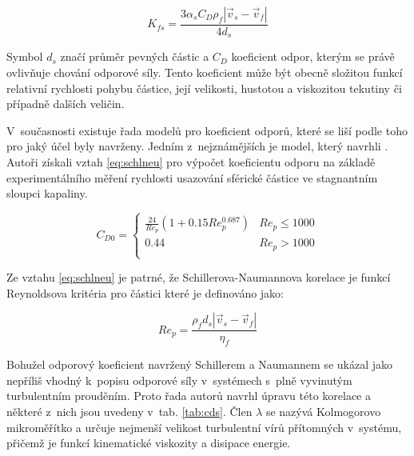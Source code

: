 \begin{equation}
	K_{fs}= \frac{3\alpha_{s}C_{D}\rho_{f}|\vec{v}_{s} - \vec{v}_{f}|}{4d_{s}}
	\label{eq:kfs}
\end{equation}
  
\noindent Symbol $d_{s}$ značí průměr pevných částic a $C_{D}$ koeficient odpor, kterým se právě ovlivňuje chování odporové síly. Tento koeficient může být obecně složitou funkcí relativní rychlosti pohybu částice, její velikosti, hustotou a viskozitou tekutiny či případně dalších veličin.   

V~současnosti existuje řada modelů pro koeficient odporů, které se liší podle toho pro jaký účel byly navrženy. Jedním z~nejznámějších je model, který navrhli \citet{schi32}. Autoři získali vztah \ref{eq:schlneu} pro výpočet koeficientu odporu na základě experimentálního měření rychlosti usazování sférické částice ve stagnantním sloupci kapaliny.    
 
	\hypertarget{hyp:schlneu}{} 
\begin{equation}
	\label{eq:schlneu}
  C_{D0} = \left\{ \begin{array}{ll}
  \frac{24}{Re_{p}}  \left( 1 + \num{0.15}Re_{p}^{\num{0.687}} \right) & Re_{p} \le 1000\\
  \num{0.44} & Re_{p} > 1000\\
  \end{array} \right.
\end{equation}

\noindent Ze vztahu \ref{eq:schlneu} je patrné, že Schillerova-Naumannova korelace je funkcí Reynoldsova kritéria pro částici které je definováno jako:

\begin{equation}
	Re_{p}= \frac{\rho_{f}d_{s}|\vec{v}_{s} - \vec{v}_{f}|}{\eta_{f}}
	\label{eq:reyp}
\end{equation}

Bohužel odporový koeficient navržený Schillerem a Naumannem se ukázal jako nepříliš vhodný k~popisu odporové síly v~systémech s~plně vyvinutým turbulentním prouděním. Proto řada autorů navrhl úpravu této korelace a některé z~nich jsou uvedeny v~tab. \ref{tab:cds}. Člen $\lambda$ se nazývá Kolmogorovo mikroměřítko a určuje nejmenší velikost turbulentní vírů přítomných v~systému, přičemž je funkcí kinematické viskozity a disipace energie.

